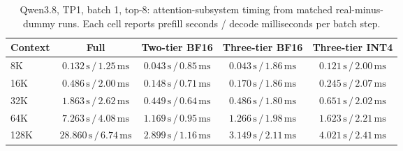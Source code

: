\begin{table}[t]
\centering
\small
\caption{Qwen3.8, TP1, batch 1, top-8: attention-subsystem timing from matched real-minus-dummy runs. Each cell reports prefill seconds / decode milliseconds per batch step.}
\label{tab:prolong-qwen38-tp1-b1-attention-core}
\begin{tabular}{lcccc}
\toprule
Context & Full & Two-tier BF16 & Three-tier BF16 & Three-tier INT4 \\
\midrule
8K & \(0.132\,\mathrm{s}\,/\,1.25\,\mathrm{ms}\) & \(0.043\,\mathrm{s}\,/\,0.85\,\mathrm{ms}\) & \(0.043\,\mathrm{s}\,/\,1.86\,\mathrm{ms}\) & \(0.121\,\mathrm{s}\,/\,2.00\,\mathrm{ms}\) \\
16K & \(0.486\,\mathrm{s}\,/\,2.00\,\mathrm{ms}\) & \(0.148\,\mathrm{s}\,/\,0.71\,\mathrm{ms}\) & \(0.170\,\mathrm{s}\,/\,1.86\,\mathrm{ms}\) & \(0.245\,\mathrm{s}\,/\,2.07\,\mathrm{ms}\) \\
32K & \(1.863\,\mathrm{s}\,/\,2.62\,\mathrm{ms}\) & \(0.449\,\mathrm{s}\,/\,0.64\,\mathrm{ms}\) & \(0.486\,\mathrm{s}\,/\,1.80\,\mathrm{ms}\) & \(0.651\,\mathrm{s}\,/\,2.02\,\mathrm{ms}\) \\
64K & \(7.263\,\mathrm{s}\,/\,4.08\,\mathrm{ms}\) & \(1.169\,\mathrm{s}\,/\,0.95\,\mathrm{ms}\) & \(1.266\,\mathrm{s}\,/\,1.98\,\mathrm{ms}\) & \(1.623\,\mathrm{s}\,/\,2.21\,\mathrm{ms}\) \\
128K & \(28.860\,\mathrm{s}\,/\,6.74\,\mathrm{ms}\) & \(2.899\,\mathrm{s}\,/\,1.16\,\mathrm{ms}\) & \(3.149\,\mathrm{s}\,/\,2.11\,\mathrm{ms}\) & \(4.021\,\mathrm{s}\,/\,2.41\,\mathrm{ms}\) \\
\bottomrule
\end{tabular}
\end{table}


